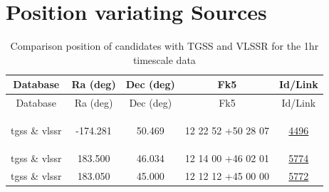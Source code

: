 \documentclass{article}
\begin{document}
\section{Position variating Sources}\label{possection:KmeulenSimSource:1hr}

\begin{longtable}{c|c|c|c|c} 
\toprule 
Database & Ra (deg) & Dec (deg)& Fk5 & Id/Link \\\midrule 
\endfirsthead 
\toprule 
Database & Ra (deg) & Dec (deg) & Fk5 &Id/Link  \\\midrule 
\endhead 
\bottomrule 
\endfoot 
\bottomrule
\caption{ Comparison position of candidates with TGSS and VLSSR for the 1hr timescale data} 
\endlastfoot
\label{KmeulenSimSource:1hr:tablepos}

tgss \& vlssr & -174.281 & 50.469 & 12 22 52 +50 28 07 &  \href{http://banana.transientskp.org/r4/vlo_KmeulenSimSource/runningcatalog/4496}{4496} \\
tgss \& vlssr & 183.500 & 46.034 & 12 14 00 +46 02 01 &  \href{http://banana.transientskp.org/r4/vlo_KmeulenSimSource/runningcatalog/5774}{5774} \\
tgss \& vlssr & 183.050 & 45.000 & 12 12 12 +45 00 00 &  \href{http://banana.transientskp.org/r4/vlo_KmeulenSimSource/runningcatalog/5772}{5772} \\
\end{longtable}
\end{document}
